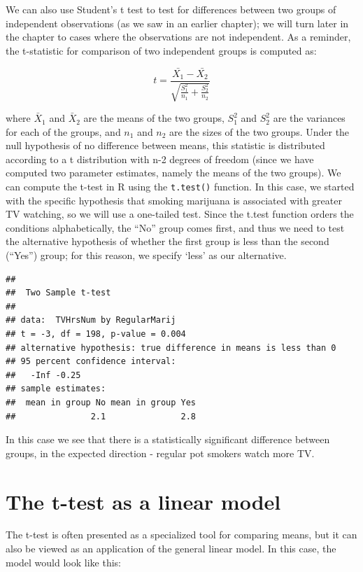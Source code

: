 \documentclass[12pt,]{book}
\theoremstyle{definition}
\theoremstyle{definition}
\theoremstyle{definition}
\theoremstyle{remark}
\begin{document}
We can also use Student's t test to test for differences between two groups of independent observations (as we saw in an earlier chapter); we will turn later in the chapter to cases where the observations are not independent. As a reminder, the t-statistic for comparison of two independent groups is computed as:

\[
t = \frac{\bar{X_1} - \bar{X_2}}{\sqrt{\frac{S_1^2}{n_1} + \frac{S_2^2}{n_2}}}
\]

where \(\bar{X}_1\) and \(\bar{X}_2\) are the means of the two groups, \(S^2_1\) and \(S^2_2\) are the variances for each of the groups, and \(n_1\) and \(n_2\) are the sizes of the two groups. Under the null hypothesis of no difference between means, this statistic is distributed according to a t distribution with n-2 degrees of freedom (since we have computed two parameter estimates, namely the means of the two groups). We can compute the t-test in R using the \texttt{t.test()} function. In this case, we started with the specific hypothesis that smoking marijuana is associated with greater TV watching, so we will use a one-tailed test. Since the t.test function orders the conditions alphabetically, the ``No'' group comes first, and thus we need to test the alternative hypothesis of whether the first group is less than the second (``Yes'') group; for this reason, we specify `less' as our alternative.

\begin{verbatim}
## 
##  Two Sample t-test
## 
## data:  TVHrsNum by RegularMarij
## t = -3, df = 198, p-value = 0.004
## alternative hypothesis: true difference in means is less than 0
## 95 percent confidence interval:
##   -Inf -0.25
## sample estimates:
##  mean in group No mean in group Yes 
##               2.1               2.8
\end{verbatim}

In this case we see that there is a statistically significant difference between groups, in the expected direction - regular pot smokers watch more TV.

\hypertarget{ttest-linear-model}{%
\section{The t-test as a linear model}\label{ttest-linear-model}}

The t-test is often presented as a specialized tool for comparing means, but it can also be viewed as an application of the general linear model. In this case, the model would look like this:
\end{document}
